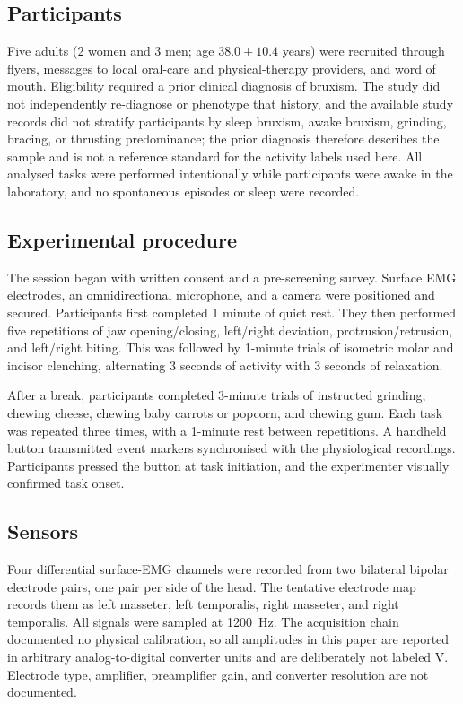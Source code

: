 \documentclass[pdflatex,sn-nature,iicol]{sn-jnl}
\begin{document}
\subsection{Participants}

Five adults (2 women and 3 men; age $38.0 \pm 10.4$ years) were recruited through flyers, messages to local oral-care and physical-therapy providers, and word of mouth. Eligibility required a prior clinical diagnosis of bruxism. The study did not independently re-diagnose or phenotype that history, and the available study records did not stratify participants by sleep bruxism, awake bruxism, grinding, bracing, or thrusting predominance; the prior diagnosis therefore describes the sample and is not a reference standard for the activity labels used here. All analysed tasks were performed intentionally while participants were awake in the laboratory, and no spontaneous episodes or sleep were recorded.

\subsection{Experimental procedure}

The session began with written consent and a pre-screening survey. Surface EMG electrodes, an omnidirectional microphone, and a camera were positioned and secured. Participants first completed 1 minute of quiet rest. They then performed five repetitions of jaw opening/closing, left/right deviation, protrusion/retrusion, and left/right biting. This was followed by 1-minute trials of isometric molar and incisor clenching, alternating 3 seconds of activity with 3 seconds of relaxation.

After a break, participants completed 3-minute trials of instructed grinding, chewing cheese, chewing baby carrots or popcorn, and chewing gum. Each task was repeated three times, with a 1-minute rest between repetitions. A handheld button transmitted event markers synchronised with the physiological recordings. Participants pressed the button at task initiation, and the experimenter visually confirmed task onset.

\subsection{Sensors}

Four differential surface-EMG channels were recorded from two bilateral bipolar electrode pairs, one pair per side of the head. The tentative electrode map records them as left masseter, left temporalis, right masseter, and right temporalis. All signals were sampled at 1200~Hz. The acquisition chain documented no physical calibration, so all amplitudes in this paper are reported in arbitrary analog-to-digital converter units and are deliberately not labeled \textmu V. Electrode type, amplifier, preamplifier gain, and converter resolution are not documented.
\end{document}

